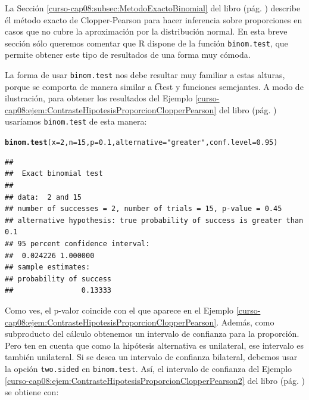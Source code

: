 \documentclass[10pt,a4paper]{article}\usepackage[]{graphicx}\usepackage[]{color}
\makeatletter
\newcommand{\hlnum}[1]{\textcolor[rgb]{0.686,0.059,0.569}{#1}}%
\newcommand{\hlstr}[1]{\textcolor[rgb]{0.192,0.494,0.8}{#1}}%
\newcommand{\hlstd}[1]{\textcolor[rgb]{0.345,0.345,0.345}{#1}}%
\newcommand{\hlkwc}[1]{\textcolor[rgb]{0.333,0.667,0.333}{#1}}%
\newcommand{\hlkwd}[1]{\textcolor[rgb]{0.737,0.353,0.396}{\textbf{#1}}}%
\newenvironment{kframe}{%
 \def\at@end@of@kframe{}%
 \ifinner\ifhmode%
  \def\at@end@of@kframe{\end{minipage}}%
  \begin{minipage}{\columnwidth}%
 \fi\fi%
 \def\FrameCommand##1{\hskip\@totalleftmargin \hskip-\fboxsep
 \colorbox{shadecolor}{##1}\hskip-\fboxsep
     \hskip-\linewidth \hskip-\@totalleftmargin \hskip\columnwidth}%
 \MakeFramed {\advance\hsize-\width
   \@totalleftmargin\z@ \linewidth\hsize
   \@setminipage}}%
 {\par\unskip\endMakeFramed%
 \at@end@of@kframe}
\newenvironment{knitrout}{}{} %
\makeatother
\begin{document}
La Sección \ref{curso-cap08:subsec:MetodoExactoBinomial} del libro (pág. \pageref{curso-cap08:subsec:MetodoExactoBinomial}) describe él método exacto de Clopper-Pearson para hacer inferencia sobre proporciones en casos que no cubre la aproximación por la distribución normal.  En esta breve sección sólo queremos comentar que R dispone de la función {\tt binom.test}, que permite obtener este tipo de resultados de una forma muy cómoda.

La forma de usar {\tt binom.test} nos debe resultar muy familiar a estas alturas, porque se comporta de manera similar a {\t t.test} y funciones semejantes. A modo de ilustración, para obtener los resultados del Ejemplo \ref{curso-cap08:ejem:ContrasteHipotesisProporcionClopperPearson} del libro (pág. \pageref{curso-cap08:ejem:ContrasteHipotesisProporcionClopperPearson}) usaríamos {\tt binom.test} de esta manera:

\begin{knitrout}
\color{fgcolor}\begin{kframe}
\begin{alltt}
\hlkwd{binom.test}\hlstd{(}\hlkwc{x} \hlstd{=} \hlnum{2}\hlstd{,} \hlkwc{n} \hlstd{=} \hlnum{15}\hlstd{,} \hlkwc{p} \hlstd{=} \hlnum{0.1}\hlstd{,} \hlkwc{alternative} \hlstd{=} \hlstr{"greater"}\hlstd{,} \hlkwc{conf.level} \hlstd{=} \hlnum{0.95}\hlstd{)}
\end{alltt}
\begin{verbatim}
## 
## 	Exact binomial test
## 
## data:  2 and 15
## number of successes = 2, number of trials = 15, p-value = 0.45
## alternative hypothesis: true probability of success is greater than 0.1
## 95 percent confidence interval:
##  0.024226 1.000000
## sample estimates:
## probability of success 
##                0.13333
\end{verbatim}
\end{kframe}
\end{knitrout}

Como ves, el p-valor coincide con el que aparece en el Ejemplo \ref{curso-cap08:ejem:ContrasteHipotesisProporcionClopperPearson}. Además, como subproducto del cálculo obtenemos un intervalo de confianza para la proporción. Pero ten en cuenta que como la hipótesis alternativa es unilateral, ese intervalo es también unilateral. Si se desea un intervalo de confianza bilateral, debemos usar la opción {\tt two.sided} en {\tt binom.test}. Así, el intervalo de confianza del Ejemplo \ref{curso-cap08:ejem:ContrasteHipotesisProporcionClopperPearson2} del libro (pág. \pageref{curso-cap08:ejem:ContrasteHipotesisProporcionClopperPearson2}) se obtiene con:
\end{document}
